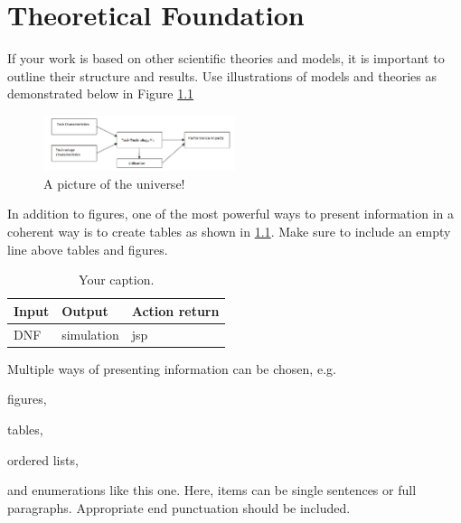\chapter{Theoretical Foundation}

If your work is based on other scientific theories and models, it is important to outline their structure and results. Use illustrations of models and theories as demonstrated below in Figure \ref{fig1}

\begin{figure}[H]
\centering
  \includegraphics[width=0.5\textwidth]{grafiken/fig1}
   \caption{A picture of the universe!}
   \label{fig1}
\end{figure}


In addition to figures, one of the most powerful ways to present information in a coherent way is to create tables as shown in \ref{tab:table-name}. Make sure to include an empty line above tables and figures.
\begin{center}
\begin{table}[H]
\begin{tabularx}{\textwidth}{|X|X|X|}
\hline
Input & Output& Action return \\
\hline
DNF &  simulation & jsp\\
\hline
\end{tabularx}
\caption{\label{tab:table-name}Your caption.}
\end{table}
\end{center}


Multiple ways of presenting information can be chosen, e.g.

\begin{list}{•}{}
\item figures,
\item tables,
\item ordered lists,
\item and enumerations like this one. Here, items can be single sentences or full paragraphs. Appropriate end punctuation should be included.

\end{list}

